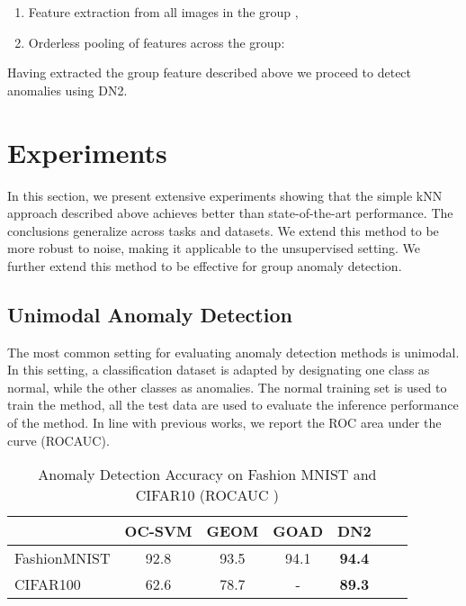 \documentclass{article}
\begin{document}
\begin{enumerate}
    \item Feature extraction from all images in the group , \\ 
    \item Orderless pooling of features across the group: \\ 
\end{enumerate}

Having extracted the group feature described above we proceed to detect anomalies using DN2.


\section{Experiments}
\label{sec:exp}

In this section, we present extensive experiments showing that the simple kNN approach described above achieves better than state-of-the-art performance. The conclusions generalize across tasks and datasets. We extend this method to be more robust to noise, making it applicable to the unsupervised setting. We further extend this method to be effective for group anomaly detection.

\subsection{Unimodal Anomaly Detection}
\label{subsec:exp:uni}

The most common setting for evaluating anomaly detection methods is unimodal. In this setting, a classification dataset is adapted by designating one class as normal, while the other classes as anomalies. The normal training set is used to train the method, all the test data are used to evaluate the inference performance of the method. In line with previous works, we report the ROC area under the curve (ROCAUC).


\begin{table}
  \centering
  \caption{Anomaly Detection Accuracy on Fashion MNIST and CIFAR10 (ROCAUC )}
  

    \begin{tabular}{lcccccc}
    \toprule      

   & OC-SVM & GEOM & GOAD & DN2 \\
    \midrule
   FashionMNIST & 92.8 & 93.5 & 94.1  & \textbf{94.4}\\
   CIFAR100 &  62.6 & 78.7 & - & \textbf{89.3} \\

	 \bottomrule
    \end{tabular}
    \label{tab:exp_small_extra}
\end{table}
\end{document}
